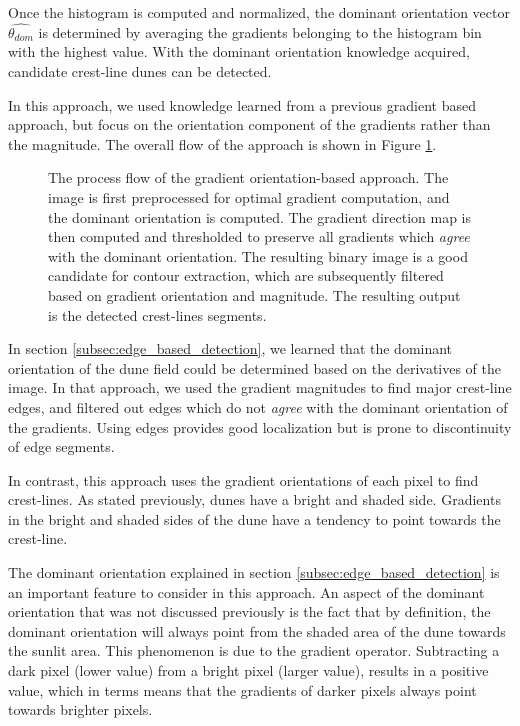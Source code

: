  Once the histogram is computed and normalized, the dominant orientation vector $\hat{\theta_{dom}}$ is determined by averaging the gradients belonging to the histogram bin with the highest value. With the dominant orientation knowledge acquired, candidate crest-line dunes can be detected.
  
In this approach, we used knowledge learned from a previous gradient based approach, but focus on the orientation component of the gradients rather than the magnitude. The overall flow of the approach is shown in Figure \ref{fig:flow_gradient_orientation}. 

\begin{figure}[H]
	\centering
	\caption{The process flow of the gradient orientation-based approach. The image is first preprocessed for optimal gradient computation, and the dominant orientation is computed. The gradient direction map is then computed and thresholded to preserve all gradients which \emph{agree} with the dominant orientation. The resulting binary image is a good candidate for contour extraction, which are subsequently filtered based on gradient orientation and magnitude. The resulting output is the detected crest-lines segments. }
	\label{fig:flow_gradient_orientation}
\end{figure}



In section \ref{subsec:edge_based_detection}, we learned that the dominant orientation of the dune field could be determined based on the derivatives of the image. In that approach, we used the gradient magnitudes to find major crest-line edges, and filtered out edges which do not \emph{agree} with the dominant orientation of the gradients. Using edges provides good localization but is prone to discontinuity of edge segments.

In contrast, this approach uses the gradient orientations of each pixel to find crest-lines. As stated previously, dunes have a bright and shaded side. Gradients in the bright and shaded sides of the dune have a tendency to point towards the crest-line.

The dominant orientation explained in section \ref{subsec:edge_based_detection} is an important feature to consider in this approach. An aspect of the dominant orientation that was not discussed previously is the fact that by definition, the dominant orientation will always point from the shaded area of the dune towards the sunlit area. This phenomenon is due to the gradient operator. Subtracting a dark pixel (lower value) from a bright pixel (larger value), results in a positive value, which in terms means that the gradients of darker pixels always point towards brighter pixels.

